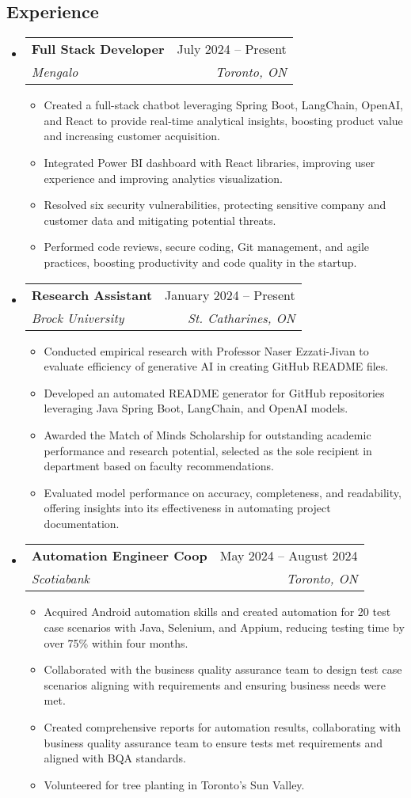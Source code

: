 \documentclass[letterpaper,11pt]{article}
\makeatletter
\newcommand{\resumeItem}[1]{
  \item\small{
    {#1 \vspace{-2pt}}
  }
}
\newcommand{\resumeSubheading}[4]{
  \vspace{-2pt}\item
    \begin{tabular*}{0.97\textwidth}[t]{l@{\extracolsep{\fill}}r}
      \textbf{#1} & #2 \\
      \textit{\small#3} & \textit{\small #4} \\
    \end{tabular*}\vspace{-7pt}
}
\newcommand{\resumeSubHeadingListStart}{\begin{itemize}[leftmargin=0.15in, label={}]}
\newcommand{\resumeSubHeadingListEnd}{\end{itemize}}
\newcommand{\resumeItemListStart}{\begin{itemize}}
\newcommand{\resumeItemListEnd}{\end{itemize}\vspace{-5pt}}
\makeatother
\begin{document}
 \begin{center}

\section{Experience}

 \resumeSubHeadingListStart
    \resumeSubheading
    {Full Stack Developer  }{July 2024 -- Present}
    {Mengalo}{Toronto, ON}
      \resumeItemListStart
        \resumeItem{Created a full-stack chatbot leveraging Spring Boot, LangChain, OpenAI, and React to provide real-time analytical insights, boosting product value and increasing customer acquisition. }
        \resumeItem{Integrated Power BI dashboard with React libraries, improving user experience and improving analytics visualization.}
        \resumeItem{Resolved six security vulnerabilities, protecting sensitive company and customer data and mitigating potential threats.}
        \resumeItem{Performed code reviews, secure coding, Git management, and agile practices, boosting productivity and code quality in the startup.}
    \resumeItemListEnd
\resumeSubHeadingListEnd

\resumeSubHeadingListStart
    \resumeSubheading
    {Research Assistant}{January 2024 -- Present}
    {Brock University}{St. Catharines, ON}
      \resumeItemListStart
        \resumeItem{Conducted empirical research with Professor Naser Ezzati-Jivan to evaluate efficiency of generative AI in creating GitHub README files.}
        \resumeItem {Developed an automated README generator for GitHub repositories leveraging Java Spring Boot, LangChain, and OpenAI models.}
        \resumeItem{Awarded the Match of Minds Scholarship for outstanding academic performance and research potential, selected as the sole recipient in department based on faculty recommendations.}
        \resumeItem{Evaluated model performance on accuracy, completeness, and readability, offering insights into its effectiveness in automating project documentation.}
    \resumeItemListEnd
\resumeSubHeadingListEnd

  \resumeSubHeadingListStart
    \resumeSubheading
    {Automation Engineer Coop}{May 2024 -- August 2024}
    {Scotiabank}{Toronto, ON}
      \resumeItemListStart
        \resumeItem{Acquired Android automation skills and created automation for 20 test case scenarios with Java, Selenium, and Appium, reducing testing time by over 75\% within four months.}
        \resumeItem{Collaborated with the business quality assurance team to design test case scenarios aligning with requirements and ensuring business needs were met.}
        \resumeItem{Created comprehensive reports for automation results, collaborating with business quality assurance team to ensure tests met requirements and aligned with BQA standards.}
        \resumeItem{Volunteered for tree planting in Toronto's Sun Valley.}
    \resumeItemListEnd
\resumeSubHeadingListEnd


\end{center}
\end{document}
